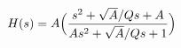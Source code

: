 \hsize 0pt
\vsize 0pt
\nopagenumbers
\overfullrule 0pt
\noindent
$$
H(s) = A \Bigl({s^2 + {\sqrt{A} / Q}s + A \over
As^2 + {\sqrt{A}/Q}s + 1}\Bigr)
$$
\bye